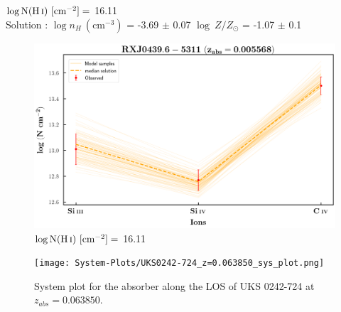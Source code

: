   
  $\log \text{N}(\ion{H}{i}) \ [\text{cm}^{-2}]=$  16.11  \\ \hspace*{4mm}
  Solution : $\log n_H \ (\text{cm}^{-3})$ = -3.69 $\pm$ 0.07 \hspace{10mm} $\log \ Z/Z_\odot$ = -1.07 $\pm$ 0.1 \newline
  
  \begin{figure}[!h]
      \centering
      \includegraphics[width=0.9\linewidth]{Ionisation-Modelling-Plots/rxj0439-z=0.005568-compII_logZ=-1.png}
      \caption{$\log \text{N}(\ion{H}{i}) \ [\text{cm}^{-2}]=$ 16.11}
  \end{figure}
  
  
  
  \newpage
  \thispagestyle{empty}

  \begin{landscape}
  
  \begin{figure}
      \centering
      \vspace{-10mm}
      \hspace*{-20mm}
      \texttt{[image: System-Plots/UKS0242-724\_z=0.063850\_sys\_plot.png]}
      \caption{System plot for the absorber along the LOS of UKS 0242-724 at $z_{abs} = 0.063850$. }
  \end{figure}
  
  \end{landscape}
  

